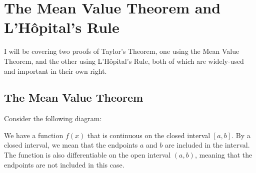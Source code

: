 \documentclass{article}
\begin{document}
\section*{The Mean Value Theorem and L'Hôpital's Rule}

I will be covering two proofs of Taylor's Theorem, one using the Mean Value Theorem, and the other using L'Hôpital's Rule, both of which are widely-used and important in their own right.

\subsection*{The Mean Value Theorem}

Consider the following diagram:

\begin{center}
\end{center}

We have a function $f(x)$ that is continuous on the closed interval $[a, b]$. By a closed interval, we mean that the endpoints $a$ and $b$ are included in the interval. The function is also differentiable on the open interval $(a, b)$, meaning that the endpoints are not included in this case.
\end{document}

